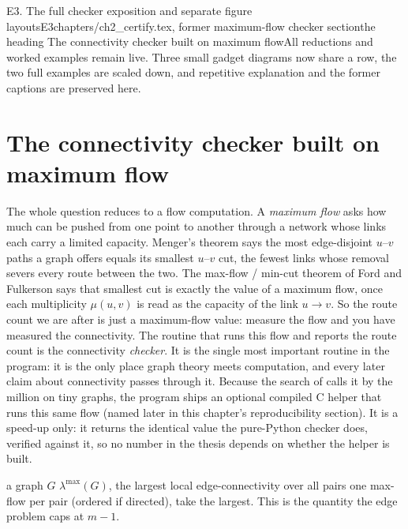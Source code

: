 \begin{offcut}{E3. The full checker exposition and separate figure layouts}{E3}{chapters/ch2\_certify.tex, former maximum-flow checker section}{the heading The connectivity checker built on maximum flow}{All reductions and worked examples remain live. Three small gadget diagrams now share a row, the two full examples are scaled down, and repetitive explanation and the former captions are preserved here.}
\section{The connectivity checker built on maximum flow}
The whole question reduces to a flow computation. A \emph{maximum flow} asks how much can be pushed from one point to another through a network whose links each carry a limited capacity. Menger's theorem says the most edge-disjoint $u$--$v$ paths a graph offers equals its smallest $u$--$v$ cut, the fewest links whose removal severs every route between the two. The max-flow / min-cut theorem of Ford and Fulkerson \NoHyper\cite{FordFulkerson56}\endNoHyper{} says that smallest cut is exactly the value of a maximum flow, once each multiplicity $\mu(u,v)$ is read as the capacity of the link $u \to v$. So the route count we are after is just a maximum-flow value: measure the flow and you have measured the connectivity. The routine that runs this flow and reports the route count is the connectivity \emph{checker}. It is the single most important routine in the program: it is the only place graph theory meets computation, and every later claim about connectivity passes through it. Because the search of  calls it by the million on tiny graphs, the program ships an optional compiled C helper that runs this same flow (named later in this chapter's reproducibility section). It is a speed-up only: it returns the identical value the pure-Python checker does, verified against it, so no number in the thesis depends on whether the helper is built.

{a graph $G$}
{$\lambda^{\max}(G)$, the largest local edge-connectivity over all pairs}
{one max-flow per pair (ordered if directed), take the largest. This is the quantity the edge problem caps at $m-1$.}


\end{offcut}
